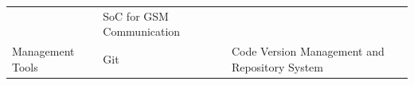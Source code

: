 \documentclass[]{book}
\begin{document}
\begin{longtable}[]{@{}lll@{}}
\begin{minipage}[t]{0.13\columnwidth}
\end{minipage} & \begin{minipage}[t]{0.64\columnwidth}\raggedright\strut
SoC for GSM Communication\strut
\end{minipage}\tabularnewline
\begin{minipage}[t]{0.13\columnwidth}\raggedright\strut
Management Tools\strut
\end{minipage} & \begin{minipage}[t]{0.13\columnwidth}\raggedright\strut
Git\strut
\end{minipage} & \begin{minipage}[t]{0.64\columnwidth}\raggedright\strut
Code Version Management and Repository System\strut
\end{minipage}\tabularnewline
\bottomrule
\end{longtable}
\end{document}

